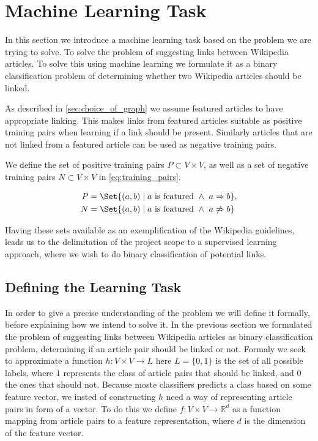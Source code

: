 \section{Machine Learning Task}\label{sec:machine_learning_task}
In this section we introduce a machine learning task based on the problem we are trying to solve. To solve the problem of suggesting links between Wikipedia articles. To solve this using machine learning we formulate it as a binary classification problem of determining whether two Wikipedia articles should be linked.

As described in \cref{sec:choice_of_graph} we assume featured articles to have appropriate linking. This makes links from featured articles suitable as positive training pairs when learning if a link should be present. Similarly articles that are not linked from a featured article can be used as negative training pairs.

We define the set of positive training pairs $P \subset V \times V$, as well as a set of negative training pairs $N \subset V \times V$ in \cref{eq:training_pairs}.

\begin{equation}
\label{eq:training_pairs}
  \begin{split}
    P &= \Set{(a,b) \mid a\text{ is featured}\ \wedge\ a \Rightarrow b}, \\
    N &= \Set{(a,b) \mid a\text{ is featured}\ \wedge\ a \not\Rightarrow b}
  \end{split}
\end{equation}

Having these sets available as an exemplification of the Wikipedia guidelines, leads us to the delimitation of the project scope to a supervised learning approach, where we wish to do binary classification of potential links.


\subsection{Defining the Learning Task}
\label{sec:ml_def}
In order to give a precise understanding of the problem we will define it formally, before explaining how we intend to solve it.
In the previous section we formulated the problem of suggesting links between Wikipedia articles as binary classification problem, determining if an article pair should be linked or not. Formaly we seek to approximate a function $h: V \times V \to L$ here $L=\{0,1\}$ is the set of all possible labels, where $1$ represents the class of article pairs that should be linked, and $0$ the ones that should not.
Because moste classifiers predicts a class based on some feature vector, we insted of constructing $h$ need a way of representing article pairs in form of a vector. To do this we define $f: V\times V \to \mathbb{R}^d$ as a function mapping from article pairs to a feature representation, where $d$ is the dimension of the feature vector. 

